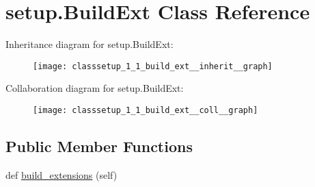 \hypertarget{classsetup_1_1_build_ext}{}\section{setup.\+Build\+Ext Class Reference}
\label{classsetup_1_1_build_ext}


Inheritance diagram for setup.\+Build\+Ext\+:
\nopagebreak
\begin{figure}[H]
\begin{center}
\leavevmode
\texttt{[image: classsetup\_1\_1\_build\_ext\_\_inherit\_\_graph]}
\end{center}
\end{figure}


Collaboration diagram for setup.\+Build\+Ext\+:
\nopagebreak
\begin{figure}[H]
\begin{center}
\leavevmode
\texttt{[image: classsetup\_1\_1\_build\_ext\_\_coll\_\_graph]}
\end{center}
\end{figure}
\subsection*{Public Member Functions}
\begin{DoxyCompactItemize}
\item 
def \hyperlink{classsetup_1_1_build_ext_ae5dd612ab8d9a1acb6e965f899021be5}{build\+\_\+extensions} (self)
\end{DoxyCompactItemize}
